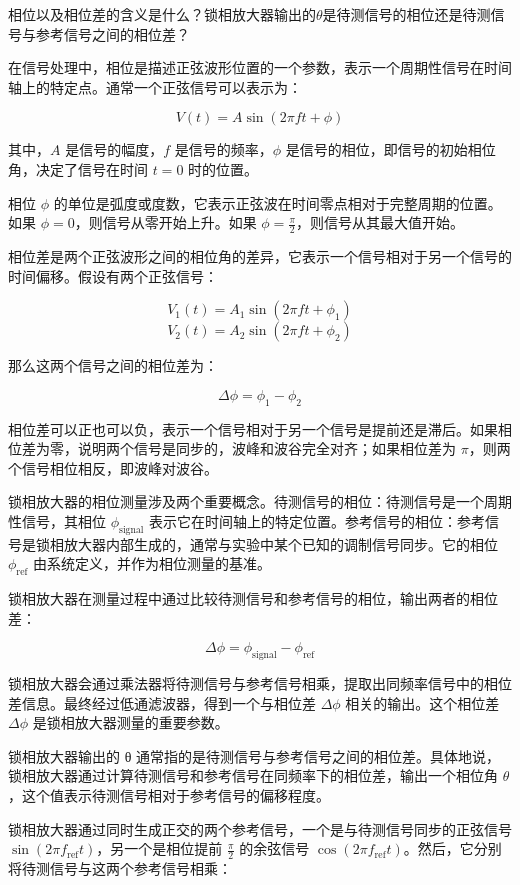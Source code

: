 \begin{question}
	相位以及相位差的含义是什么？锁相放大器输出的$\theta$是待测信号的相位还是待测信号与参考信号之间的相位差？
\end{question}
在信号处理中，相位是描述正弦波形位置的一个参数，表示一个周期性信号在时间轴上的特定点。通常一个正弦信号可以表示为：

\[
V(t) = A \sin(2\pi f t + \phi)
\]

其中，\( A \) 是信号的幅度，\( f \) 是信号的频率，\( \phi \) 是信号的相位，即信号的初始相位角，决定了信号在时间 \( t = 0 \) 时的位置。

相位 \( \phi \) 的单位是弧度或度数，它表示正弦波在时间零点相对于完整周期的位置。如果 \( \phi = 0 \)，则信号从零开始上升。如果 \( \phi = \frac{\pi}{2} \)，则信号从其最大值开始。

相位差是两个正弦波形之间的相位角的差异，它表示一个信号相对于另一个信号的时间偏移。假设有两个正弦信号：

\[
V_1(t) = A_1 \sin(2\pi f t + \phi_1)
\]
\[
V_2(t) = A_2 \sin(2\pi f t + \phi_2)
\]

那么这两个信号之间的相位差为：

\[
\Delta \phi = \phi_1 - \phi_2
\]

相位差可以正也可以负，表示一个信号相对于另一个信号是提前还是滞后。如果相位差为零，说明两个信号是同步的，波峰和波谷完全对齐；如果相位差为 \( \pi \)，则两个信号相位相反，即波峰对波谷。

锁相放大器的相位测量涉及两个重要概念。待测信号的相位：待测信号是一个周期性信号，其相位 \( \phi_{\text{signal}} \) 表示它在时间轴上的特定位置。参考信号的相位：参考信号是锁相放大器内部生成的，通常与实验中某个已知的调制信号同步。它的相位 \( \phi_{\text{ref}} \) 由系统定义，并作为相位测量的基准。

锁相放大器在测量过程中通过比较待测信号和参考信号的相位，输出两者的相位差：

\[
\Delta \phi = \phi_{\text{signal}} - \phi_{\text{ref}}
\]

锁相放大器会通过乘法器将待测信号与参考信号相乘，提取出同频率信号中的相位差信息。最终经过低通滤波器，得到一个与相位差 \( \Delta \phi \) 相关的输出。这个相位差 \( \Delta \phi \) 是锁相放大器测量的重要参数。

锁相放大器输出的 θ 通常指的是待测信号与参考信号之间的相位差。具体地说，锁相放大器通过计算待测信号和参考信号在同频率下的相位差，输出一个相位角 \( \theta \)，这个值表示待测信号相对于参考信号的偏移程度。

锁相放大器通过同时生成正交的两个参考信号，一个是与待测信号同步的正弦信号 \( \sin(2\pi f_{\text{ref}} t) \)，另一个是相位提前 \( \frac{\pi}{2} \) 的余弦信号 \( \cos(2\pi f_{\text{ref}} t) \)。然后，它分别将待测信号与这两个参考信号相乘：

